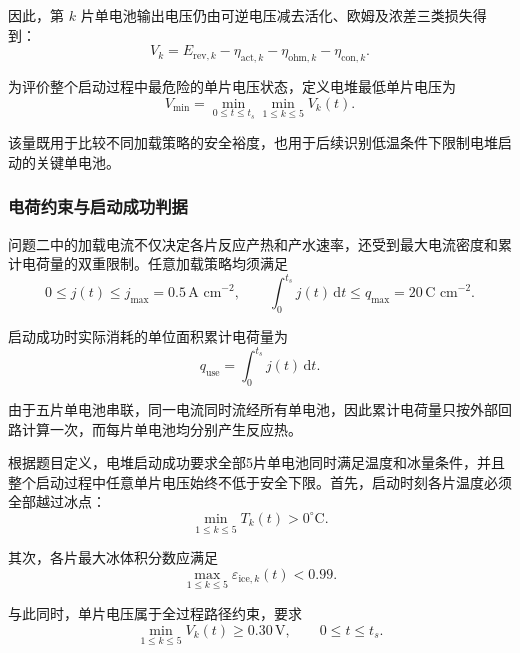 \documentclass[bwprint]{gmcmthesis}
\numberwithin{figure}{section}
\begin{document}
\noindent 因此，第 \(k\) 片单电池输出电压仍由可逆电压减去活化、欧姆及浓差三类损失得到：
\begin{equation}
V_k = E_{\text{rev},k} - \eta_{\text{act},k} - \eta_{\text{ohm},k} - \eta_{\text{con},k}. \tag{5-41}
\end{equation}

\noindent 为评价整个启动过程中最危险的单片电压状态，定义电堆最低单片电压为
\begin{equation}
V_{\text{min}} = \min_{0 \le t \le t_s} \min_{1 \le k \le 5} V_k(t). \tag{5-42}
\end{equation}

\noindent 该量既用于比较不同加载策略的安全裕度，也用于后续识别低温条件下限制电堆启动的关键单电池。

\subsubsection{电荷约束与启动成功判据}

\noindent 问题二中的加载电流不仅决定各片反应产热和产水速率，还受到最大电流密度和累计电荷量的双重限制。任意加载策略均须满足
\begin{equation}
0 \leq j(t) \leq j_{\text{max}} = 0.5 \, \text{A cm}^{-2}, \qquad \int_0^{t_s} j(t) \, \mathrm{d}t \leq q_{\text{max}} = 20 \, \text{C cm}^{-2}. \tag{5-43}
\end{equation}

\noindent 启动成功时实际消耗的单位面积累计电荷量为
\begin{equation}
q_{\text{use}} = \int_0^{t_s} j(t) \, \mathrm{d}t. \tag{5-44}
\end{equation}

\noindent 由于五片单电池串联，同一电流同时流经所有单电池，因此累计电荷量只按外部回路计算一次，而每片单电池均分别产生反应热。

\noindent 根据题目定义，电堆启动成功要求全部5片单电池同时满足温度和冰量条件，并且整个启动过程中任意单片电压始终不低于安全下限。首先，启动时刻各片温度必须全部越过冰点：
\begin{equation}
\min_{1 \leq k \leq 5} T_k(t) > 0^\circ\text{C}. \tag{5-45}
\end{equation}

\noindent 其次，各片最大冰体积分数应满足
\begin{equation}
\max_{1 \leq k \leq 5} \varepsilon_{\text{ice},k}(t) < 0.99. \tag{5-46}
\end{equation}

\noindent 与此同时，单片电压属于全过程路径约束，要求
\begin{equation}
\min_{1 \leq k \leq 5} V_k(t) \geq 0.30 \, \text{V}, \qquad 0 \leq t \leq t_s. \tag{5-47}
\end{equation}
\end{document}
